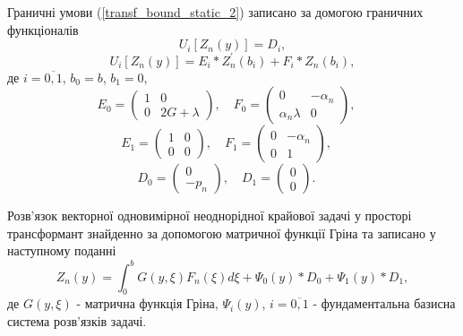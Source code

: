 Граничні умови (\ref{transf_bound_static_2}) записано за домогою граничних функціоналів
\begin{equation}\label{transf_bound_mat_static_2}
    U_i\left[ Z_n(y) \right] = D_i,
\end{equation}
\begin{equation}
    U_i\left[ Z_n(y) \right] = E_i * Z_n^{'}(b_i) + F_i * Z_n(b_i),
\end{equation}
де $i = \overline{0, 1}$, $b_0 = b$, $b_1 = 0$,
\begin{equation*}
    E_0 = \begin{pmatrix}
        1 & 0 \\
        0 & 2G + \lambda
    \end{pmatrix}, \quad
    F_0 = \begin{pmatrix}
        0 & -\alpha_n \\
        \alpha_n \lambda & 0
    \end{pmatrix}, \quad
\end{equation*}
\begin{equation*}
    E_1 = \begin{pmatrix}
        1 & 0 \\
        0 & 0
    \end{pmatrix}, \quad
    F_1 = \begin{pmatrix}
        0 & -\alpha_n \\
        0 & 1
    \end{pmatrix}, \quad
\end{equation*}
\begin{equation*}
    D_0 = \begin{pmatrix}
        0 \\
        -p_n
    \end{pmatrix}, \quad
    D_1 = \begin{pmatrix}
        0 \\
        0
    \end{pmatrix}. \quad
\end{equation*}

Розв'язок векторної одновимірної неоднорідної крайової задачі у просторі трансформант знайденно за допомогою матричної функції Гріна
та записано у наступному поданні \cite{popov_2}
\begin{equation}\label{transf_gen_sol_static_2}
    Z_n(y) = \int_0^b G(y,\xi) F_n(\xi) d\xi + \Psi_0(y) * D_0 + \Psi_1(y) * D_1,
\end{equation}
де $G(y,\xi)$ - матрична функція Гріна, $\Psi_i(y)$, $i=\overline{0, 1}$ - фундаментальна базисна система розв'язків задачі.


